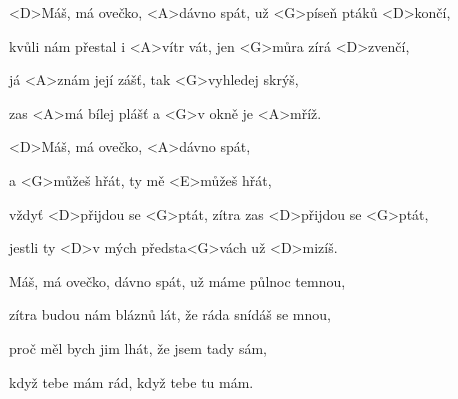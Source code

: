

\zs
<D>Máš, má ovečko, <A>dávno spát, už <G>píseň ptáků <D>končí,

kvůli nám přestal i <A>vítr vát, jen <G>můra zírá <D>zvenčí,

já <A>znám její zášť, tak <G>vyhledej skrýš,

zas <A>má bílej plášť a <G>v okně je <A>mříž.
\ks

\zr
<D>Máš, má ovečko, <A>dávno spát,

a <G>můžeš hřát, ty mě <E>můžeš hřát,

vždyť <D>přijdou se <G>ptát, zítra zas <D>přijdou se <G>ptát,

jestli ty <D>v mých předsta<G>vách už <D>mizíš.
\kr

\zs
Máš, má ovečko, dávno spát, už máme půlnoc temnou,

zítra budou nám bláznů lát, že ráda snídáš se mnou,

proč měl bych jim lhát, že jsem tady sám,

když tebe mám rád, když tebe tu mám.
\ks

\zr\kr

\kp
